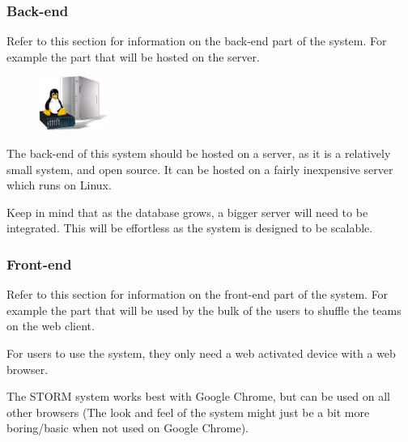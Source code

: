 \subsubsection{Back-end}
	Refer to this section for information on the back-end part of the system. For example the part that will be hosted on the server.\par
	\vspace{0.3cm}
	
\begin{figure}
    \includegraphics[width=0.2\textwidth]{./graphics/LinuxServer.jpg}
\end{figure}

The back-end of this system should be hosted on a server, as it is a relatively small system, and open source. It can be hosted on a fairly inexpensive server which runs on Linux.

Keep in mind that as the database grows, a bigger server will need to be integrated.  This will be effortless as the system is designed to be scalable.


\subsubsection{Front-end}
	Refer to this section for information on the front-end part of the system. For example the part that will be used by the bulk of the users to shuffle the teams on the web client.\par
	\vspace{0.3cm}
	
For users to use the system, they only need a web activated device with a web browser.

The STORM system works best with Google Chrome, but can be used on all other browsers (The look and feel of the system might just be a bit more boring/basic when not used on Google Chrome).
